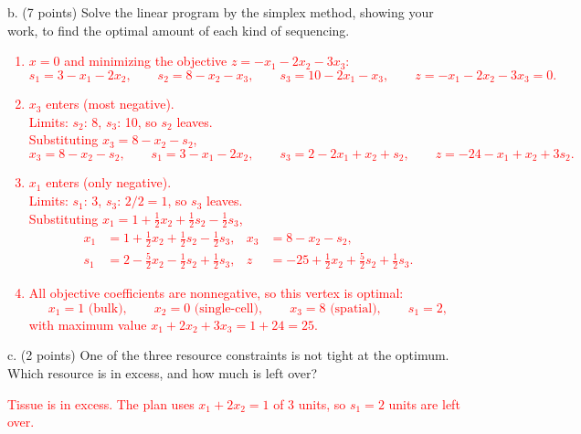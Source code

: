 \documentclass[11pt]{article}
\begin{document}
b. (7 points) Solve the linear program by the simplex method, showing your work, to find the
optimal amount of each kind of sequencing.
\textcolor{red}{
\begin{enumerate}
\item $x = 0$ and minimizing the objective $z = -x_1 - 2x_2 - 3x_3$:
\[
s_1 = 3 - x_1 - 2x_2, \qquad s_2 = 8 - x_2 - x_3, \qquad s_3 = 10 - 2x_1 - x_3, \qquad z = -x_1 - 2x_2 - 3x_3 = 0.
\]
\item $x_3$ enters (most negative). \\
Limits: $s_2$: 8, $s_3$: 10, so $s_2$ leaves. \\
Substituting $x_3 = 8 - x_2 - s_2$,
\[
x_3 = 8 - x_2 - s_2, \qquad s_1 = 3 - x_1 - 2x_2, \qquad s_3 = 2 - 2x_1 + x_2 + s_2, \qquad z = -24 - x_1 + x_2 + 3s_2.
\]
\item $x_1$ enters (only negative). \\
Limits: $s_1$: 3, $s_3$: $2/2 = 1$, so $s_3$ leaves. \\
Substituting $x_1 = 1 + \tfrac12 x_2 + \tfrac12 s_2 - \tfrac12 s_3$,
\begin{align*}
x_1 &= 1 + \tfrac12 x_2 + \tfrac12 s_2 - \tfrac12 s_3, & x_3 &= 8 - x_2 - s_2, \\
s_1 &= 2 - \tfrac52 x_2 - \tfrac12 s_2 + \tfrac12 s_3, & z &= -25 + \tfrac12 x_2 + \tfrac52 s_2 + \tfrac12 s_3.
\end{align*}
\item All objective coefficients are nonnegative, so this vertex is optimal:
\[
x_1 = 1 \text{ (bulk)}, \qquad x_2 = 0 \text{ (single-cell)}, \qquad x_3 = 8 \text{ (spatial)}, \qquad s_1 = 2,
\]
with maximum value $x_1 + 2x_2 + 3x_3 = 1 + 24 = 25$.
\end{enumerate}
}

c. (2 points) One of the three resource constraints is not tight at the optimum. Which resource
is in excess, and how much is left over?

\textcolor{red}{
Tissue is in excess. The plan uses $x_1 + 2x_2 = 1$ of 3 units, so $s_1 = 2$ units are left over.
}
\end{document}
